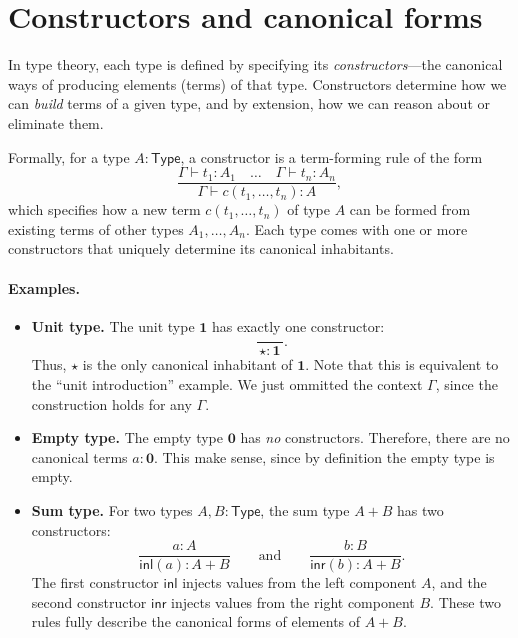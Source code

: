 \documentclass{article}
\newcommand{\Type}{\mathsf{Type}}
\newcommand{\inl}{\mathsf{inl}}
\newcommand{\inr}{\mathsf{inr}}
\begin{document}
\section{Constructors and canonical forms}

In type theory, each type is defined by specifying its \emph{constructors}—the canonical ways of producing elements (terms) of that type.  
Constructors determine how we can \emph{build} terms of a given type, and by extension, how we can reason about or eliminate them.

Formally, for a type \(A : \Type\), a constructor is a term-forming rule of the form
\[
\frac{\Gamma \vdash t_1 : A_1 \quad \dots \quad \Gamma \vdash t_n : A_n}{\Gamma \vdash c(t_1,\dots,t_n) : A},
\]
which specifies how a new term \(c(t_1,\dots,t_n)\) of type \(A\) can be formed from existing terms of other types \(A_1,\dots,A_n\).  
Each type comes with one or more constructors that uniquely determine its canonical inhabitants.

\paragraph{Examples.}

\begin{itemize}
  \item \textbf{Unit type.}  
  The unit type \(\mathbf{1}\) has exactly one constructor:
  \[
  \frac{}{\,\star : \mathbf{1}\,}.
  \]
  Thus, \(\star\) is the only canonical inhabitant of \(\mathbf{1}\). Note that this is equivalent to the ``unit introduction'' example. We just ommitted the context $\Gamma$, since the construction holds for any $\Gamma$.

  \item \textbf{Empty type.}  
  The empty type \(\mathbf{0}\) has \emph{no} constructors.  
  Therefore, there are no canonical terms \(a : \mathbf{0}\). This make sense, since by definition the empty type is empty.

  \item \textbf{Sum type.}  
  For two types \(A, B : \Type\), the sum type \(A + B\) has two constructors:
  \[
  \frac{a : A}{\inl(a) : A + B}
  \qquad\text{and}\qquad
  \frac{b : B}{\inr(b) : A + B}.
  \]
  The first constructor \(\inl\) injects values from the left component \(A\),
  and the second constructor \(\inr\) injects values from the right component \(B\).
  These two rules fully describe the canonical forms of elements of \(A + B\).
\end{itemize}
\end{document}
